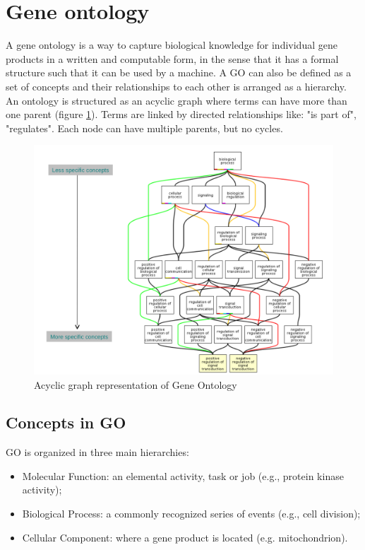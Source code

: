 \section{Gene ontology}
A gene ontology is a way to capture biological knowledge for individual gene products in a written and computable form, in the sense that it has a formal structure such that it can be used by a machine.
A GO can also be defined as a set of concepts and their relationships to each other is arranged as a hierarchy.
An ontology is structured as an acyclic graph where terms can have more than one parent (figure \ref{fig:GO}).
	Terms are linked by directed relationships like: "is part of", "regulates".
	Each node can have multiple parents, but no cycles. 
	
\begin{figure}
\centering
\includegraphics[scale=0.35]{GO}
\caption{Acyclic graph representation of Gene Ontology}
\label{fig:GO}
\end{figure}

\subsection{Concepts in GO}
GO is organized in three main hierarchies:
\begin{itemize}
\item Molecular Function: an elemental activity, task or job (e.g., protein kinase activity);
\item Biological Process: a commonly recognized series of events (e.g., cell division);
\item Cellular Component: where a gene product is located (e.g. mitochondrion).
\end{itemize}

